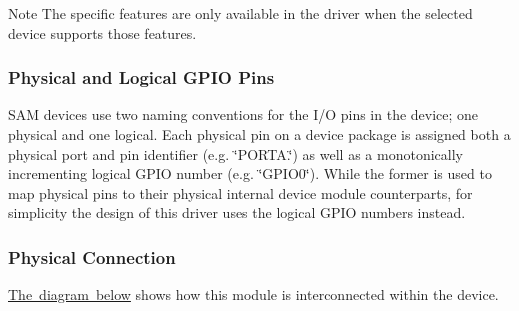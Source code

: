 \begin{DoxyNote}{Note}
The specific features are only available in the driver when the selected device supports those features.
\end{DoxyNote}
\hypertarget{group__asfdoc__sam0__port__group_asfdoc_sam0_port_module_overview_pin_numbering}{}\subsubsection{Physical and Logical G\+P\+I\+O Pins}\label{group__asfdoc__sam0__port__group_asfdoc_sam0_port_module_overview_pin_numbering}
S\+AM devices use two naming conventions for the I/O pins in the device; one physical and one logical. Each physical pin on a device package is assigned both a physical port and pin identifier (e.\+g. \char`\"{}\+P\+O\+R\+T\+A.\char`\"{}) as well as a monotonically incrementing logical G\+P\+IO number (e.\+g. \char`\"{}\+G\+P\+I\+O0\char`\"{}). While the former is used to map physical pins to their physical internal device module counterparts, for simplicity the design of this driver uses the logical G\+P\+IO numbers instead.\hypertarget{group__asfdoc__sam0__port__group_asfdoc_sam0_port_module_overview_physical}{}\subsubsection{Physical Connection}\label{group__asfdoc__sam0__port__group_asfdoc_sam0_port_module_overview_physical}
\mbox{\hyperlink{group__asfdoc__sam0__port__group_asfdoc_sam0_port_module_int_connections}{The diagram below}} shows how this module is interconnected within the device.

\label{group__asfdoc__sam0__port__group_asfdoc_sam0_port_module_int_connections}%
%

